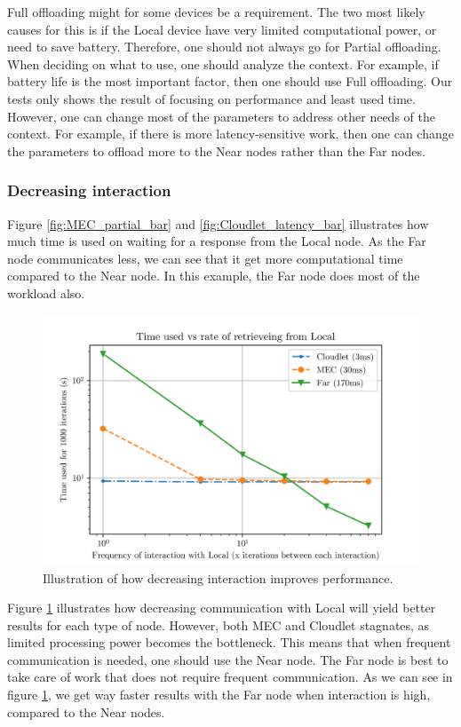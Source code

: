 Full offloading might for some devices be a requirement. The two most likely causes for this is if the Local device have very limited computational power, or need to save battery. Therefore, one should not always go for Partial offloading. When deciding on what to use, one should analyze the context. For example, if battery life is the most important factor, then one should use Full offloading. Our tests only shows the result of focusing on performance and least used time. However, one can change most of the parameters to address other needs of the context. For example, if there is more latency-sensitive work, then one can change the parameters to offload more to the Near nodes rather than the Far nodes.



\subsubsection{Decreasing interaction}
Figure \ref{fig:MEC_partial_bar} and \ref{fig:Cloudlet_latency_bar} illustrates how much time is used on waiting for a response from the Local node. As the Far node communicates less, we can see that it get more computational time compared to the Near node. In this example, the Far node does most of the workload also. 


\begin{figure}
    \centering
    \includegraphics{chapters/evaluation/figures/All_latency.png}
    \caption{Illustration of how decreasing interaction improves performance.}
    \label{fig:all_graph_decrease}
\end{figure}

Figure \ref{fig:all_graph_decrease} illustrates how decreasing communication with Local will yield better results for each type of node. However, both MEC and Cloudlet stagnates, as limited processing power becomes the bottleneck. This means that when frequent communication is needed, one should use the Near node. The Far node is best to take care of work that does not require frequent communication. As we can see in figure \ref{fig:all_graph_decrease}, we get way faster results with the Far node when interaction is high, compared to the Near nodes.





